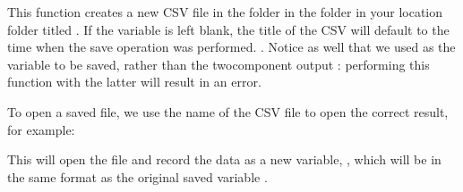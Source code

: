 \documentclass[letterpaper,10pt,english]{sphinxmanual}
\begin{document}
\sphinxAtStartPar
{}

\sphinxAtStartPar
This function creates a new CSV file in the  folder
in the  folder in your location folder titled
. If the  variable is left blank,
the title of the CSV will default to the time when the save operation
was performed. . Notice as well
that we used  as the variable to be
saved, rather than the two\sphinxhyphen{}component output :
performing this function with the latter will result in an error.

\sphinxAtStartPar
To open a saved file, we use the name of the CSV file to open the
correct result, for example:

\sphinxAtStartPar
{}

\sphinxAtStartPar
This will open the  file and record the data
as a new variable, , which will be in the same
format as the original saved variable
.
\end{document}
